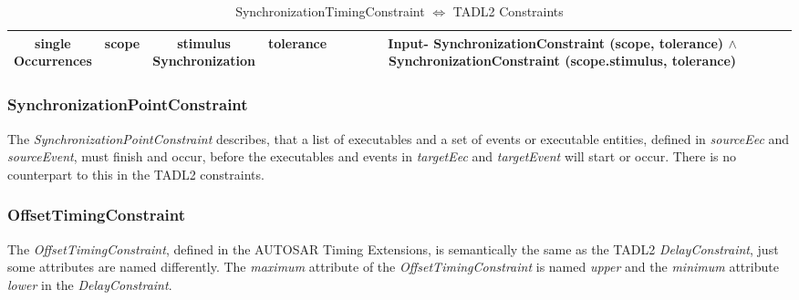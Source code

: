 \begin{table}
\begin{tabular}{|c|c|c|c|c|}
				\hline
				\makecell{single\\Occurrences}  & scope & \makecell{stimulus\\Synchronization} & tolerance & \makecell{Input-\\SynchronizationConstraint\\\hspace{.5cm}(scope, tolerance)\\ $\land$ SynchronizationConstraint\\\hspace{.5cm}(scope.stimulus, tolerance)}\\
				\hline
			\end{tabular}
			\caption{SynchronizationTimingConstraint $\Leftrightarrow$ TADL2 Constraints}
			\label{ComparisonSynchronizationConstraints}
		\end{table}
	
	\subsubsection{SynchronizationPointConstraint}
		The \emph{SynchronizationPointConstraint} describes, that a list of executables and a set of events or executable entities, defined in \emph{sourceEec} and \emph{sourceEvent},  must finish and occur, before the executables and events in \emph{targetEec} and \emph{targetEvent} will start or occur. There is no counterpart to this in the TADL2 constraints.
		
	\subsubsection{OffsetTimingConstraint}
		The \emph{OffsetTimingConstraint}, defined in the AUTOSAR Timing Extensions, is semantically the same as the TADL2 \emph{DelayConstraint}, just some attributes are named differently. The \emph{maximum} attribute of the \emph{OffsetTimingConstraint} is named \emph{upper} and the \emph{minimum} attribute \emph{lower} in the \emph{DelayConstraint}.
		
